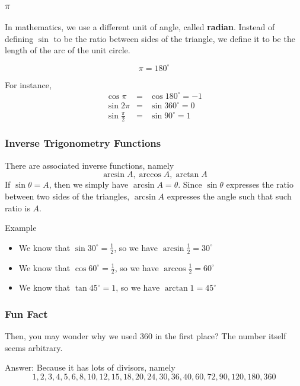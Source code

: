 \begin{frame}
\frametitle{$\pi$}
In mathematics, we use a different unit of angle, called \textbf{radian}. Instead of defining $\sin$ to be the ratio between sides of the triangle, we define it to be the length of the arc of the unit circle.

\begin{block}{}
\[ \pi = 180^{\circ}\]
\end{block}

For instance, 
\begin{eqnarray*}
\cos \pi &=& \cos 180^{\circ} = -1 \\
\sin 2\pi &=& \sin 360^{\circ} = 0\\
\sin \frac{\pi}{2} &=& \sin 90^{\circ} = 1
\end{eqnarray*}
\end{frame}

\begin{frame}
\frametitle{Inverse Trigonometry Functions}
There are associated inverse functions, namely
\[ \arcsin A, \arccos A, \arctan A\]
If $\sin \theta = A$, then we simply have $\arcsin A = \theta$. Since $\sin \theta$ expresses the ratio between two sides of the triangles, $\arcsin A$ expresses the angle such that such ratio is $A$.

\begin{exampleblock}{Example}
\begin{itemize}
\item We know that $\sin 30^{\circ} = \frac{1}{2}$, so we have $\arcsin \frac{1}{2} = 30^{\circ}$
\item We know that $\cos 60^{\circ} = \frac{1}{2}$, so we have $\arccos \frac{1}{2} = 60^{\circ}$
\item We know that $\tan 45^{\circ} = 1$, so we have $\arctan 1 = 45^{\circ}$
\end{itemize}
\end{exampleblock}
\end{frame}

\begin{frame}
\frametitle{Fun Fact}
Then, you may wonder why we used 360 in the first place? The number itself seems arbitrary.
\bigskip

Answer: Because it has lots of divisors, namely
\[1,2,3,4,5,6,8,10,12,15,18,20,24, 30, 36, 40, 60, 72, 90, 120, 180, 360\]
\end{frame}

